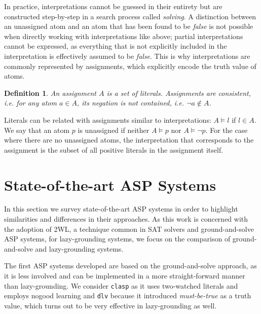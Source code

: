 \documentclass{vutinfth} %
\newtheorem{definition}{Definition}[chapter]
\newcommand{\mbt}{must-be-true\xspace}
\newcommand{\ass}{A}
\newcommand{\clasp}{\texttt{clasp}\xspace}
\newcommand{\dlv}{\texttt{dlv}\xspace}
\begin{document}
In practice, interpretations cannot be guessed in their entirety but are constructed step-by-step in a search process called \emph{solving}. A distinction between an unassigned atom and an atom that has been found to be \emph{false} is not possible when directly working with interpretations like above; partial interpretations cannot be expressed, as everything that is not explicitly included in the interpretation is effectively assumed to be \emph{false}. This is why interpretations are commonly represented by assignments, which explicitly encode the truth value of atoms.

\begin{definition}
An \emph{assignment} $\ass$ is a set of literals. Assignments are consistent, i.e. for any atom $a \in \ass$, its negation is not contained, i.e. $\neg a \not \in \ass$.
\end{definition}

Literals can be related with assignments similar to interpretations: $A \models l$ if $l \in A$. We say that an atom $p$ is unassigned if neither $A \models p$ nor $A \models \neg p$. For the case where there are no unassigned atoms, the interpretation that corresponds to the assignment is the subset of all positive literals in the assignment itself.


\section{State-of-the-art ASP Systems}

In this section we survey state-of-the-art ASP systems in order to highlight similarities and differences in their approaches. As this work is concerned with the adoption of 2WL, a technique common in SAT solvers and ground-and-solve ASP systems, for lazy-grounding systems, we focus on the comparison of ground-and-solve and lazy-grounding systems.

The first ASP systems developed are based on the ground-and-solve approach, as it is less involved and can be implemented in a more straight-forward manner than lazy-grounding. We consider \clasp as it uses two-watched literals and employs nogood learning and \dlv because it introduced \emph{\mbt} as a truth value, which turns out to be very effective in lazy-grounding as well.
\end{document}
